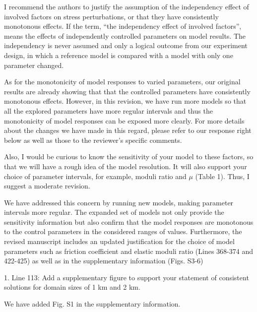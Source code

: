 \documentclass[12pt]{article}
\begin{document}
\begin{response}{I recommend the authors to justify the assumption of the independency effect of involved factors on stress perturbations, or that they have consistently monotonous effects.}
    If the term, ``the independency effect of involved factors'', means the effects of independently controlled parameters on model results. The independency is never assumed and only a logical outcome from our experiment design, in which a reference model is compared with a model with only one parameter changed. 

As for the monotonicity of model responses to varied parameters, our original results are already showing that that the controlled parameters have consistently monotonous effects. However, in this revision, we have run more models so that all the explored parameters have more regular intervals and thus the monotonicity of model responses can be exposed more clearly. For more details about the changes we have made in this regard, please refer to our response right below as well as those to the reviewer's specific comments.
\end{response}

\begin{response}{Also, I would be curious to know the sensitivity of your model to these factors, so that we will have a rough idea of the model resolution. It will also support your choice of parameter intervals, for example, moduli ratio and $\mu$ (Table 1). Thus, I suggest a moderate revision.}

    We have addressed this concern by running new models, making parameter intervals more regular. The expanded set of models not only provide the sensitivity information but also confirm that the model responses are monotonous to the control parameters in the considered ranges of values. Furthermore, the revised manuscript includes an updated justification for the choice of model parameters such as friction coefficient and elastic moduli ratio (Lines 368-374 and 422-425) as well as  in the supplementary information (Figs. S3-6) 
\end{response}



\begin{response}{1. Line 113: Add a supplementary figure to support your statement of consistent solutions for domain sizes of 1 km and 2 km.}
  
We have added Fig. S1 in the supplementary information. 
    
\end{response}
\end{document}
